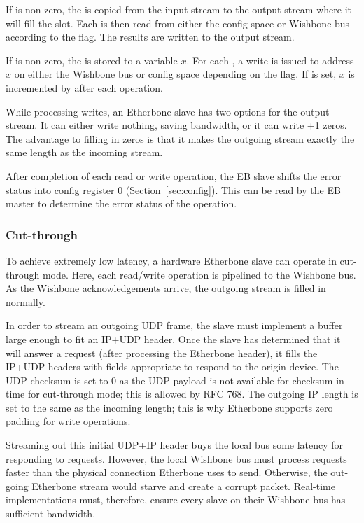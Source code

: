 \documentclass{article}
\begin{document}
If  is non-zero,
the  is copied from the input stream to the
output stream where it will fill the  slot.
Each  is then read from either the config space or
Wishbone bus according to the  flag.
The results are written to the output stream.

If  is non-zero,
the  is stored to a variable $x$.
For each , 
a write is issued to address $x$ on either the Wishbone bus or config space
depending on the  flag.
If  is set, 
$x$ is incremented by  after each operation.

While processing writes,
an Etherbone slave has two options for the output stream.
It can either write nothing, saving bandwidth,
or it can write +1 zeros.
The advantage to filling in zeros is that it makes the outgoing stream exactly
the same length as the incoming stream.

After completion of each read or write operation,
the EB slave shifts the error status into config register 0
(Section~\ref{sec:config}).
This can be read by the EB master to determine the error status of the
operation.

\subsubsection{Cut-through}
\label{sec:cut}

To achieve extremely low latency,
a hardware Etherbone slave can operate in cut-through mode.
Here, 
each read/write operation is pipelined to the Wishbone bus.
As the Wishbone acknowledgements arrive,
the outgoing stream is filled in normally.

In order to stream an outgoing UDP frame,
the slave must implement a buffer large enough to fit an IP+UDP header.
Once the slave has determined that it will answer a request
(after processing the Etherbone header),
it fills the IP+UDP headers with fields appropriate 
to respond to the origin device.
The UDP checksum is set to 0 as the UDP payload is not available for
checksum in time for cut-through mode;
this is allowed by RFC 768.
The outgoing IP length is set to the same as the incoming length;
this is why Etherbone supports zero padding for write operations.

Streaming out this initial UDP+IP header buys the local bus some 
latency for responding to requests.
However, the local Wishbone bus must process requests faster than the
physical connection Etherbone uses to send.
Otherwise, the out-going Etherbone stream would starve and create a 
corrupt packet.
Real-time implementations must, therefore, 
ensure every slave on their Wishbone bus has sufficient bandwidth.
\end{document}
